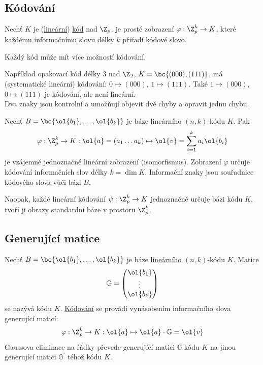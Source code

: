 \subsection{Kódování}\label{kodovani}
Nechť $K$ je (\hyperref[linKod]{lineární}) \hyperref[kod]{kód} nad $\Z_p$.  je prosté zobrazení $\varphi : \Z_p^k \rightarrow K$, které každému informačnímu slovu délky $k$ přiřadí kódové slovo.

Každý kód může mít více možností kódování.

Například opakovací kód délky 3 nad $\Z_2$, $K = \bc{(000), (111)}$, má (systematické lineární) kódování: $0 \mapsto (000)$, $1 \mapsto (111)$. Také $1 \mapsto (000)$, $0 \mapsto (111)$ je kódování, ale není lineární.\\
Dva znaky jsou kontrolní a umožňují objevit dvě chyby a opravit jednu chybu.

Nechť $B = \bc{\ol{b_1}, \dots, \ol{b_k}}$ je báze lineárního $(n,k)$-kódu $K$. Pak
\begin{equation}
	\varphi: \Z_p^k \to K: \ol{a} = (a_1 \dots a_k) \mapsto \ol{v} = \sum_{i=1}^k a_i \ol{b_i}
\end{equation}
je vzájemně jednoznačné lineární zobrazení (isomorfismus). Zobrazení $\varphi$ určuje kódování informačních slov délky $k = \dim K$. Informační znaky jsou souřadnice kódového slova vůči bázi $B$.

Naopak, každé lineární kódování $\psi : \Z_p^k \to K$ jednoznačně určuje bázi kódu $K$, tvoří ji obrazy standardní báze v prostoru $\Z_p^k$.

\subsection{Generující matice}\label{genMat}
Nechť $B = \bc{\ol{b_1}, \dots, \ol{b_k}}$ je báze \hyperref[linKod]{lineárního} $(n,k)$-kódu $K$. Matice \[\mathbb{G} = \begin{pmatrix} \ol{b_1} \\ \vdots \\ \ol{b_k}\end{pmatrix}\] se nazývá  kódu $K$. \hyperref[kodovani]{Kódování} se provádí vynásobením informačního slova generující maticí:
\begin{equation}
	\varphi : \Z_p^k \to K : \ol{a} \mapsto \ol{a} \cdot \mathbb{G} = \ol{v}
\end{equation}
Gaussova eliminace na řádky převede generující matici $\mathbb{G}$ kódu $K$ na jinou generující matici $\mathbb{G}^\prime$ téhož kódu $K$.


